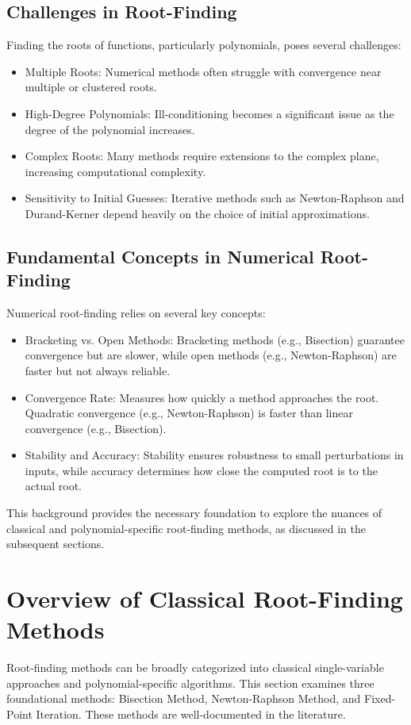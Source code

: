 \documentclass[10pt]{IEEEtran}
\begin{document}
\subsection{Challenges in Root-Finding}
Finding the roots of functions, particularly polynomials, poses several challenges:
\begin{itemize}
    \item Multiple Roots: Numerical methods often struggle with convergence near multiple or clustered roots.
    \item High-Degree Polynomials: Ill-conditioning becomes a significant issue as the degree of the polynomial increases.
    \item Complex Roots: Many methods require extensions to the complex plane, increasing computational complexity.
    \item Sensitivity to Initial Guesses: Iterative methods such as Newton-Raphson and Durand-Kerner depend heavily on the choice of initial approximations.
\end{itemize}

\subsection{Fundamental Concepts in Numerical Root-Finding}
Numerical root-finding relies on several key concepts:
\begin{itemize}
    \item Bracketing vs. Open Methods: Bracketing methods (e.g., Bisection) guarantee convergence but are slower, while open methods (e.g., Newton-Raphson) are faster but not always reliable.
    \item Convergence Rate: Measures how quickly a method approaches the root. Quadratic convergence (e.g., Newton-Raphson) is faster than linear convergence (e.g., Bisection).
    \item Stability and Accuracy: Stability ensures robustness to small perturbations in inputs, while accuracy determines how close the computed root is to the actual root.
\end{itemize}

This background provides the necessary foundation to explore the nuances of classical and polynomial-specific root-finding methods, as discussed in the subsequent sections.



\section{Overview of Classical Root-Finding Methods}
Root-finding methods can be broadly categorized into classical single-variable approaches and polynomial-specific algorithms. This section examines three foundational methods: Bisection Method, Newton-Raphson Method, and Fixed-Point Iteration. These methods are well-documented in the literature\cite{NumericalRootFindingAlgorithms2024, petkovicComputersMathematicalResearch2020}.
\end{document}
